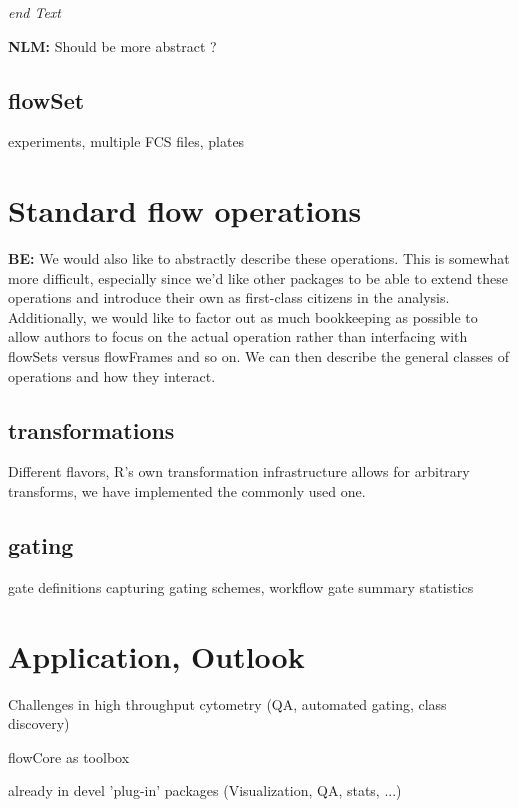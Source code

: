 \documentclass[12pt]{article}
\begin{document}
\textit{end Text}

{\bf NLM:} Should be more abstract ? 



\subsection{flowSet} 
experiments, multiple FCS files, plates


\section{Standard flow operations}
{\bf BE:} We would also like to abstractly describe these operations. This is
somewhat more difficult, especially since we'd like other packages to
be able to extend these operations and introduce their own as
first-class citizens in the analysis. Additionally, we would like to
factor out as much bookkeeping as possible to allow authors to focus
on the actual operation rather than interfacing with flowSets versus
flowFrames and so on. We can then describe the general classes of
operations and how they interact.

\subsection{transformations}
Different flavors, R's own transformation infrastructure allows for
arbitrary transforms, we have implemented the commonly used one.

\subsection{gating}
gate definitions
capturing gating schemes, workflow
gate summary statistics


\section{Application, Outlook}
Challenges in high throughput cytometry
(QA, automated gating, class discovery) 

flowCore as toolbox

already in devel 'plug-in' packages (Visualization, QA, stats, ...)

  
 
\end{document}
